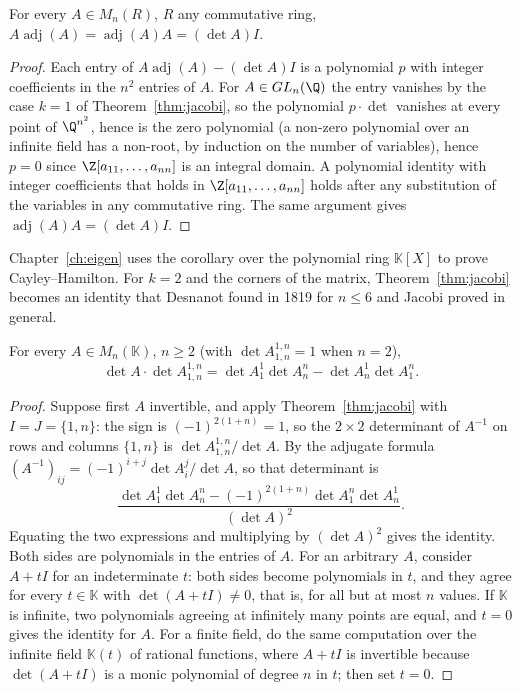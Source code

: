 \begin{corollary}\label{cor:adjugate}
For every $A\in M_n(R)$, $R$ any commutative ring, $A\operatorname{adj}(A)=\operatorname{adj}(A)A=(\det A)I$.
\end{corollary}
\begin{proof}
Each entry of $A\operatorname{adj}(A)-(\det A)I$ is a polynomial $p$ with integer coefficients in the $n^2$ entries of $A$.
For $A\in GL_n(\Q)$ the entry vanishes by the case $k=1$ of Theorem~\ref{thm:jacobi}, so the polynomial $p\cdot\det$
vanishes at every point of $\Q^{n^2}$, hence is the zero polynomial (a non-zero polynomial over an infinite field has a
non-root, by induction on the number of variables), hence $p=0$ since $\Z[a_{11},\dots,a_{nn}]$ is an integral domain.
A polynomial identity with integer coefficients that holds in $\Z[a_{11},\dots,a_{nn}]$ holds after any substitution
of the variables in any commutative ring. The same argument gives $\operatorname{adj}(A)A=(\det A)I$.
\end{proof}

Chapter~\ref{ch:eigen} uses the corollary over the polynomial ring $\mathbb K[X]$ to prove Cayley--Hamilton. For $k=2$ and
the corners of the matrix, Theorem~\ref{thm:jacobi} becomes an identity that Desnanot found in 1819 for $n\le6$ and
Jacobi proved in general.

\begin{theorem}\label{thm:desnanot}
For every $A\in M_n(\mathbb K)$, $n\ge2$ (with $\det A^{1,n}_{1,n}=1$ when $n=2$),
\[
\det A\cdot\det A^{1,n}_{1,n}=\det A^1_1\det A^n_n-\det A^1_n\det A^n_1 .
\]
\end{theorem}
\begin{proof}
Suppose first $A$ invertible, and apply Theorem~\ref{thm:jacobi} with $I=J=\{1,n\}$: the sign is $(-1)^{2(1+n)}=1$, so the
$2\times2$ determinant of $A^{-1}$ on rows and columns $\{1,n\}$ is $\det A^{1,n}_{1,n}/\det A$. By the adjugate formula
$(A^{-1})_{ij}=(-1)^{i+j}\det A^j_i/\det A$, so that determinant is
\[
\frac{\det A^1_1\det A^n_n-(-1)^{2(1+n)}\det A^n_1\det A^1_n}{(\det A)^2}.
\]
Equating the two expressions and multiplying by $(\det A)^2$ gives the identity. Both sides are polynomials in the
entries of $A$. For an arbitrary $A$, consider $A+tI$ for an indeterminate $t$: both sides become polynomials in $t$, and
they agree for every $t\in\mathbb K$ with $\det(A+tI)\ne0$, that is, for all but at most $n$ values. If $\mathbb K$ is
infinite, two polynomials agreeing at infinitely many points are equal, and $t=0$ gives the identity for $A$. For a finite
field, do the same computation over the infinite field $\mathbb K(t)$ of rational functions, where $A+tI$ is invertible
because $\det(A+tI)$ is a monic polynomial of degree $n$ in $t$; then set $t=0$.
\end{proof}

